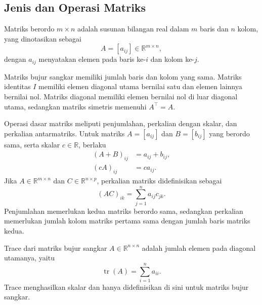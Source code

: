 \subsection{Jenis dan Operasi Matriks}
\label{subsec:jenismatriks}

\begin{definisi}
\label{def:matriks}
Matriks berordo $m\times n$ adalah susunan bilangan real dalam $m$ baris
dan $n$ kolom, yang dinotasikan sebagai
\begin{equation}
A=[a_{ij}]\in\mathbb{R}^{m\times n},
\label{eq:matriks}
\end{equation}
dengan $a_{ij}$ menyatakan elemen pada baris ke-$i$ dan kolom ke-$j$.
\end{definisi}

Matriks bujur sangkar memiliki jumlah baris dan kolom yang sama. Matriks
identitas $I$ memiliki elemen diagonal utama bernilai satu dan elemen
lainnya bernilai nol. Matriks diagonal memiliki elemen bernilai nol di
luar diagonal utama, sedangkan matriks simetris memenuhi $A^\top=A$.

Operasi dasar matriks meliputi penjumlahan, perkalian dengan skalar, dan
perkalian antarmatriks. Untuk matriks $A=[a_{ij}]$ dan $B=[b_{ij}]$
yang berordo sama, serta skalar $c\in\mathbb{R}$, berlaku
\begin{align}
(A+B)_{ij} &= a_{ij}+b_{ij},
\label{eq:penjumlahanmatriks}\\
(cA)_{ij} &= ca_{ij}.
\label{eq:perkalianskalar}
\end{align}
Jika $A\in\mathbb{R}^{m\times n}$ dan
$C\in\mathbb{R}^{n\times p}$, perkalian matriks didefinisikan sebagai
\begin{equation}
(AC)_{ik}=\sum_{j=1}^{n}a_{ij}c_{jk}.
\label{eq:perkalianmatriks}
\end{equation}
Penjumlahan memerlukan kedua matriks berordo sama, sedangkan perkalian
memerlukan jumlah kolom matriks pertama sama dengan jumlah baris matriks
kedua.

\begin{definisi}
\label{def:trace}
Trace dari matriks bujur sangkar $A\in\mathbb{R}^{n\times n}$ adalah
jumlah elemen pada diagonal utamanya, yaitu
\begin{equation}
\operatorname{tr}(A)=\sum_{i=1}^{n}a_{ii}.
\label{eq:trace}
\end{equation}
Trace menghasilkan skalar dan hanya didefinisikan di sini untuk matriks
bujur sangkar.
\end{definisi}


